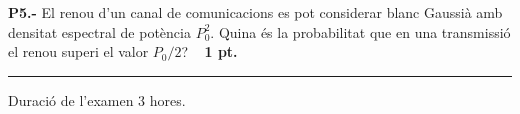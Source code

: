 \documentclass{report}
\begin{document}
\vspace{0.5 cm}

\noindent\textbf{P5.-} El renou d'un canal de comunicacions es pot considerar blanc Gaussià amb densitat 
espectral de potència $P_0^2$. Quina és la probabilitat que en una transmissió el renou superi el valor $P_0/2$?
\ \hfill{\textbf{ 1 pt.}}

\vspace{0.5 cm}

\hrule

\vspace{0.25 cm}

\noindent Duraci\'o de l'examen 3 hores.\newline
\end{document}
